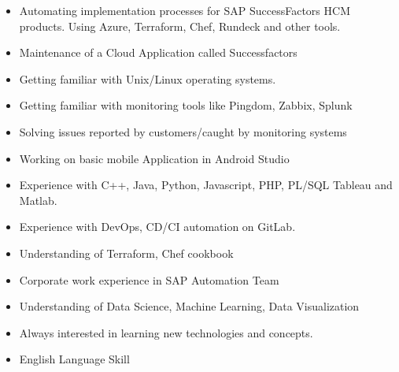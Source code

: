 \documentclass[10pt,a4paper,ragged2e,withhyper]{altacv}
\begin{document}
\begin{paracol}{2}


\begin{itemize}
\item Automating implementation processes for SAP SuccessFactors HCM products. Using Azure, Terraform, Chef, Rundeck and other tools. 
\end{itemize}
\divider

\begin{itemize}
\item Maintenance of a Cloud Application called Successfactors
\item Getting familiar with Unix/Linux operating systems.
\item Getting familiar with monitoring tools like Pingdom, Zabbix, Splunk
\item Solving issues reported by customers/caught by monitoring systems 
\end{itemize}
\divider

\begin{itemize}
\item Working on basic mobile Application in Android Studio
\end{itemize}

\divider


\begin{itemize}
\item Experience with C++, Java, Python, Javascript, PHP, PL/SQL Tableau and Matlab.
\item Experience with DevOps, CD/CI automation on GitLab.
\item Understanding of Terraform, Chef cookbook
\item Corporate work experience in SAP Automation Team
\item Understanding of Data Science, Machine Learning, Data Visualization
\item Always interested in learning new technologies and concepts. 
\item English Language Skill
\end{itemize}


\end{paracol}
\end{document}
